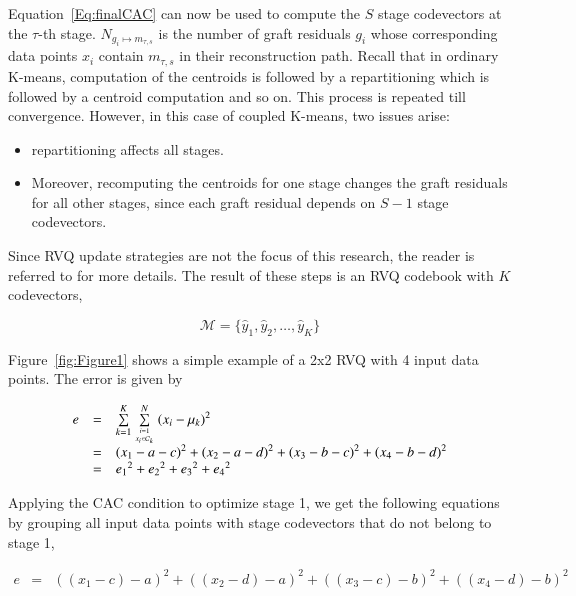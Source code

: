 \begin{Body}
Equation~\ref{Eq:finalCAC} can now be used to compute the $S$ stage codevectors at the $\tau$-th stage.  $N_{g_i \mapsto m_{\tau, s}}$ is the number of graft residuals $g_i$ whose corresponding data points $x_i$ contain $m_{\tau, s}$ in their reconstruction path.  Recall that in ordinary K-means, computation of the centroids is followed by a repartitioning which is followed by a centroid computation and so on.  This process is repeated till convergence.  However, in this case of coupled K-means, two issues arise:

\begin{itemize}
\item repartitioning affects all stages.  
\item Moreover, recomputing the centroids for one stage changes the graft residuals for all other stages, since each graft residual depends on $S-1$ stage codevectors.  
\end{itemize}

Since RVQ update strategies are not the focus of this research, the reader is referred to  \cite{1996_JNL_AdvancesRVQ_Barnes} for more details.  The result of these steps is an RVQ codebook with $K$ codevectors,

\begin{equation}
\mathcal{M} = \{\hat{y}_1, \hat{y}_2, \ldots, \hat{y}_K\}
\end{equation}

Figure~\ref{fig:Figure1} shows a simple example of a 2x2 RVQ with 4 input data points.  The error is given by



\begin{equation}
\begin{array}{lllll}
e &=& \sum\limits_{k=1}^K \sum\limits_{{i=1 \atop x_i \in \mathcal{C}_k}}^N {(x_i - \mu_k)}^2 \\
&=& {(x_1 - a - c)}^2 + {(x_2- a - d)}^2 + {(x_3 - b - c)}^2 + {(x_4 - b - d)}^2\\
&=& {e_1}^2 + {e_2}^2 + {e_3}^2 + {e_4}^2
\end{array}
\end{equation}

Applying the CAC condition to optimize stage 1, we get the following equations by grouping all input data points with stage codevectors that do not belong to stage 1,

\begin{equation}
\begin{array}{lllll}
e &=& {((x_1 - c) - a)}^2 + {((x_2- d) - a)}^2 + {((x_3 - c) - b)}^2 + {((x_4 - d) - b)}^2
\end{array}
\label{Eqn:2x2RVQ_stage1}
\end{equation}


\end{Body}
